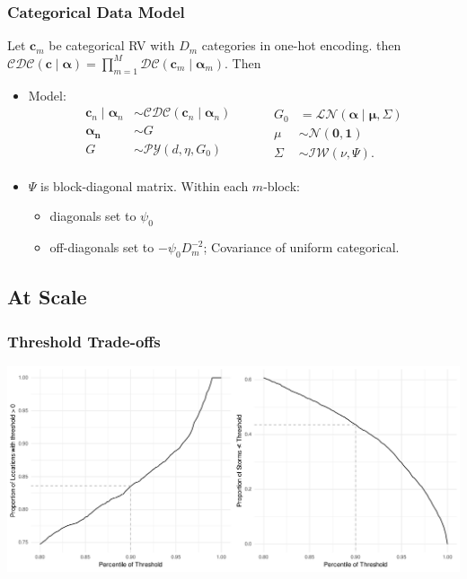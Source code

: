 \documentclass[aspectratio=169,10pt,notes]{beamer}
\newlength{\frametextheight}
\begin{document}
\begin{frame}
    \frametitle{Categorical Data Model}
    \label{ndpg:categoricaldatamodel}
    Let $\bm{c}_m$ be categorical RV with $D_m$ categories in one-hot encoding.  
    then $\mathcal{CDC}(\bm{c}\mid\bm{\alpha}) = 
        \prod_{m = 1}^M \mathcal{DC}(\bm{c}_m\mid\bm{\alpha}_m)$.  
        Then
    \begin{itemize}
    \item Model:
    \[
    \begin{aligned}
      \bm{c}_n \mid \bm{\alpha}_n &\sim 
        \mathcal{CDC}\left(\bm{c}_n\mid\bm{\alpha}_n\right)\\
      \bm{\alpha_n} &\sim G\\
      G &\sim \mathcal{PY}\left(d, \eta, G_0\right)\\
      \end{aligned}
      ~\hspace{1cm}
      \begin{aligned}
      G_0 &= \mathcal{LN}\left(\bm{\alpha}\mid\bm{\mu},\Sigma\right)\\
      \mu &\sim \mathcal{N}\left(\bm{0},\bm{1}\right)\\
      \Sigma &\sim \mathcal{IW}\left(\nu, \Psi\right).
      \end{aligned}
      \]
    \item $\Psi$ is block-diagonal matrix.  Within each $m$-block:
    \begin{itemize}
        \item diagonals set to $\psi_0$
        \item off-diagonals set to $-\psi_0D_m^{-2}$; Covariance of uniform categorical.
    \end{itemize}
    \end{itemize}
    \hyperlink{ndpg:categoricaldistributions}{}
\end{frame} %


\subsection*{At Scale}

\begin{frame}
    \frametitle{Threshold Trade-offs}
    \label{exapg:thresholdtradeoffs}
    \begin{center}
        \includegraphics[height = 0.99\frametextheight]{./ch3/plots/explore_threshold}
    \end{center}
\end{frame} %
\end{document}
